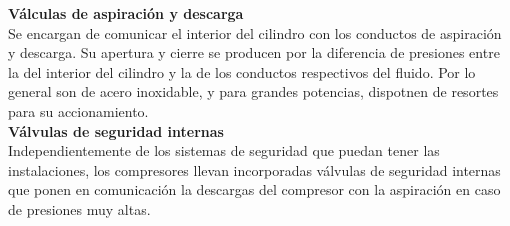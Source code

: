 \textbf{V\'alculas de aspiración y descarga}\\
Se encargan de comunicar el interior del cilindro con los conductos de aspiraci\'on y descarga. Su apertura y cierre se producen por la diferencia de presiones entre la del interior del cilindro y la de los conductos respectivos del fluido. Por lo general son de acero inoxidable, y para grandes potencias, dispotnen de resortes para su accionamiento.\\
\textbf{V\'alvulas de seguridad internas}\\
Independientemente de los sistemas de seguridad que puedan tener las instalaciones, los compresores llevan incorporadas v\'alvulas de seguridad internas que ponen en comunicaci\'on la descargas del compresor con la aspiración en caso de presiones muy altas.


